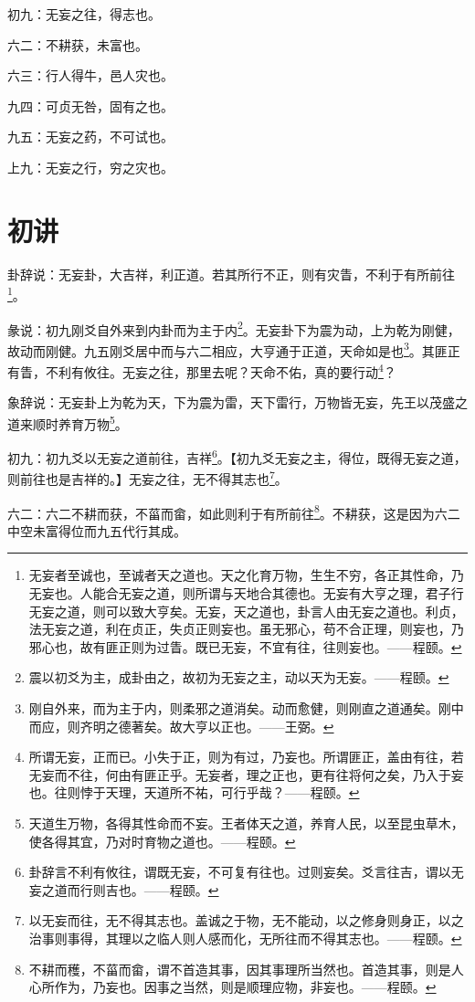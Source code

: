 \documentclass[12pt,oneside]{book}
\begin{document}
初九：无妄之往，得志也。

六二：不耕获，未富也。

六三：行人得牛，邑人灾也。

九四：可贞无咎，固有之也。

九五：无妄之药，不可试也。

上九：无妄之行，穷之灾也。

\section{初讲}
卦辞说：无妄卦，大吉祥，利正道。若其所行不正，则有灾眚，不利于有所前往\footnote{无妄者至诚也，至诚者天之道也。天之化育万物，生生不穷，各正其性命，乃无妄也。人能合无妄之道，则所谓与天地合其德也。无妄有大亨之理，君子行无妄之道，则可以致大亨矣。无妄，天之道也，卦言人由无妄之道也。利贞，法无妄之道，利在贞正，失贞正则妄也。虽无邪心，苟不合正理，则妄也，乃邪心也，故有匪正则为过眚。既已无妄，不宜有往，往则妄也。——程颐。}。

彖说：初九刚爻自外来到内卦而为主于内\footnote{震以初爻为主，成卦由之，故初为无妄之主，动以天为无妄。——程颐。}。无妄卦下为震为动，上为乾为刚健，故动而刚健。九五刚爻居中而与六二相应，大亨通于正道，天命如是也\footnote{刚自外来，而为主于内，则柔邪之道消矣。动而愈健，则刚直之道通矣。刚中而应，则齐明之德著矣。故大亨以正也。——王弼。}。其匪正有眚，不利有攸往。无妄之往，那里去呢？天命不佑，真的要行动\footnote{所谓无妄，正而已。小失于正，则为有过，乃妄也。所谓匪正，盖由有往，若无妄而不往，何由有匪正乎。无妄者，理之正也，更有往将何之矣，乃入于妄也。往则悖于天理，天道所不祐，可行乎哉？——程颐。}？

象辞说：无妄卦上为乾为天，下为震为雷，天下雷行，万物皆无妄，先王以茂盛之道来顺时养育万物\footnote{天道生万物，各得其性命而不妄。王者体天之道，养育人民，以至昆虫草木，使各得其宜，乃对时育物之道也。——程颐。}。

初九：初九爻以无妄之道前往，吉祥\footnote{卦辞言不利有攸往，谓既无妄，不可复有往也。过则妄矣。爻言往吉，谓以无妄之道而行则吉也。——程颐。}。【初九爻无妄之主，得位，既得无妄之道，则前往也是吉祥的。】无妄之往，无不得其志也\footnote{以无妄而往，无不得其志也。盖诚之于物，无不能动，以之修身则身正，以之治事则事得，其理以之临人则人感而化，无所往而不得其志也。——程颐。}。

六二：六二不耕而获，不菑而畲，如此则利于有所前往\footnote{不耕而穫，不菑而畲，谓不首造其事，因其事理所当然也。首造其事，则是人心所作为，乃妄也。因事之当然，则是顺理应物，非妄也。——程颐。}。不耕获，这是因为六二中空未富得位而九五代行其成。
\end{document}
